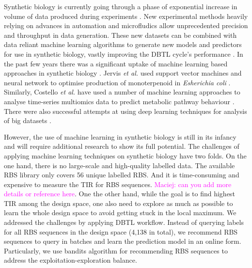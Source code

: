 \documentclass{article}
\newcommand{\mengyan}[1]{\textcolor{magenta}{#1}}
\begin{document}
Synthetic biology is currently going through a phase of exponential increase in volume of data produced during experiments \cite{Freemont2019}. 
New experimental methods heavily relying on advances in automation and microfludics allow unprecedented precision and throughput in data generation.
These new datasets can be combined with data reliant machine learning algorithms to generate new models and predictors for use in synthetic biology, vastly improving the DBTL cycle's performance \cite{Camacho2018,Radivojevic2020}. 
In the past few years there was a significant uptake of machine learning based approaches in synthetic biology \cite{LAWSON2021}.
Jervis \emph{et al.} used support vector machines and neural network to optimise production of monoterpenoid in \emph{Esherichia coli} \cite{Jervis2019}.
Similarly, Costello \emph{et al.} have used a number of machine learning approaches to analyse time-series multiomics data to predict metabolic pathway behaviour \cite{Costello2018}.
There were also successful attempts at using deep learning techniques for analysis of big datasets \cite{Alipanahi2015,Angermueller2016}. 

However, the use of machine learning in synthetic biology is still in its infancy and will require additional research to show its full potential. 
The challenges of applying machine learning techniques on synthetic biology have two folds.
On the one hand, there is no large-scale and high-quality labelled data. 
The available RBS library \cite{jervis2018machine} only covers 56 unique labelled RBS.
And it is time-consuming and expensive to measure the TIR for RBS sequences. \mengyan{Maciej: can you add more details or reference here}.
One the other hand,  while the goal is to find highest TIR among the design space, one also need to explore as much as possible to learn the whole design space to avoid getting stuck in the local maximum.  
We addressed the challenges by applying DBTL workflow. 
Instead of querying labels for all RBS sequences in the design space (4,138 in total), we recommend RBS sequences to query in batches and learn the prediction model in an online form.
Particularly, we use bandits algorithm for recommending RBS sequences to address the exploitation-exploration balance. 
\end{document}
